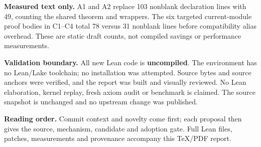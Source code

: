 \textbf{Measured text only.} A1 and A2 replace 103 nonblank declaration lines
with 49, counting the shared theorem and wrappers. The six targeted current-module
proof bodies in C1--C4 total 78 versus 31 nonblank lines before compatibility
alias overhead. These are static draft counts, not compiled savings or
performance measurements.

\textbf{Validation boundary.} All new Lean code is \textbf{uncompiled}.
The environment has no Lean/Lake toolchain; no installation was attempted.
Source bytes and source anchors were verified, and the report was built and
visually reviewed. No Lean elaboration, kernel replay, fresh axiom audit or
benchmark is claimed. The source snapshot is unchanged and no upstream change
was published.

\vfill
\textbf{Reading order.} Commit context and novelty come first; each proposal
then gives the source, mechanism, candidate and adoption gate. Full Lean files,
patches, measurements and provenance accompany this TeX/PDF report.
